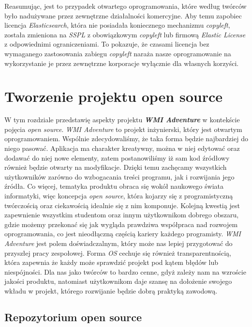 \documentclass{article}
\begin{document}
Reasumując, jest to przypadek otwartego oprogramowania, które według twórców było nadużywane przez zewnętrzne działalności komercyjne. Aby temu zapobiec licencja \emph{Elasticsearch}, która nie posiadała koniecznego mechanizmu \emph{copyleft}, została zmieniona na \emph{SSPL} z obowiązkowym \emph{copyleft} lub firmową \emph{Elastic License} z odpowiednimi ograniczeniami. To pokazuje, że czasami licencja bez wymaganego zastosowania zabiegu \emph{copyleft} naraża nasze oprogramowanie na wykorzystanie je przez zewnętrzne korporacje wyłącznie dla własnych korzyści. 

\section{Tworzenie projektu open source}

\hspace{4mm} W tym rozdziale przedstawię aspekty projektu \textbf{\emph{WMI Adventure}} w kontekście pojęcia \emph{open source}. \emph{WMI Adventure} to projekt inżynierski, który jest otwartym oprogramowaniem. Wspólnie zdecydowaliśmy, że taka forma będzie najbardziej do niego pasować. Aplikacja ma charakter kreatywny, można w niej edytować oraz dodawać do niej nowe elementy, zatem postanowiliśmy iż sam kod źródłowy również będzie otwarty na modyfikacje. Dzięki temu zachęcamy wszystkich użytkowników zarówno do wzbogacania treści programu, jak i rozwijania jego źródła. Co więcej, tematyka produktu obraca się wokół naukowego świata informatyki, więc koncepcja \emph{open source}, która kojarzy się z programistyczną twórczością oraz ciekawością idealnie się z nim komponuje. Kolejną kwestią jest zapewnienie wszystkim studentom oraz innym użytkownikom dobrego obszaru, gdzie możemy przekonać się jak wygląda prawdziwa współpraca nad rozwojem oprogramowania, co jest nieodłączną częścią kariery każdego programisty. \emph{WMI Adventure} jest polem doświadczalnym, który może nas lepiej przygotować do przyszłej pracy zespołowej. Forma \emph{OS} cechuje się również transparentnością, która zapewnia że każdy może sprawdzić projekt pod kątem błędów lub niespójności. Dla nas jako twórców to bardzo cenne, gdyż zależy nam na wzroście jakości produktu, natomiast użytkownikom daje szansę na dołożenie swojego wkładu w projekt, którego rozwijanie będzie dobrą praktyką zawodową.

\subsection{Repozytorium open source}
\end{document}
